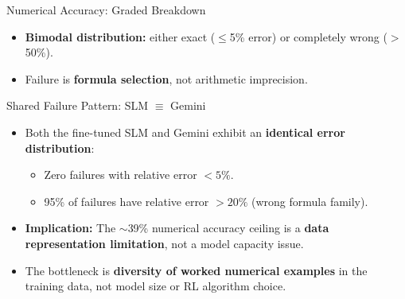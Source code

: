 \documentclass[10pt]{beamer}
\renewcommand{\footnotesize}{\tiny}
\begin{document}
\begin{frame}{Numerical Accuracy: Graded Breakdown}
\begin{center}
\end{center}

\vspace{0.2cm}
\large
\begin{itemize}
    \item \textbf{Bimodal distribution:} either exact ($\leq$5\% error) or completely wrong ($>$50\%).
    \item Failure is \textbf{formula selection}, not arithmetic imprecision.
\end{itemize}
\end{frame}

\begin{frame}{Shared Failure Pattern: SLM $\equiv$ Gemini}
\large
\begin{itemize}
    \item Both the fine-tuned SLM and Gemini exhibit an \textbf{identical error distribution}:
    \vspace{0.2cm}
    \begin{itemize}
        \item Zero failures with relative error $<5\%$.
        \item 95\% of failures have relative error $>20\%$ (wrong formula family).
    \end{itemize}
    \vspace{0.3cm}

    \item \textbf{Implication:} The $\sim$39\% numerical accuracy ceiling is a \textbf{data representation limitation}, not a model capacity issue.
    \vspace{0.3cm}

    \item The bottleneck is \textbf{diversity of worked numerical examples} in the training data, not model size or RL algorithm choice.
\end{itemize}
\end{frame}
\end{document}
